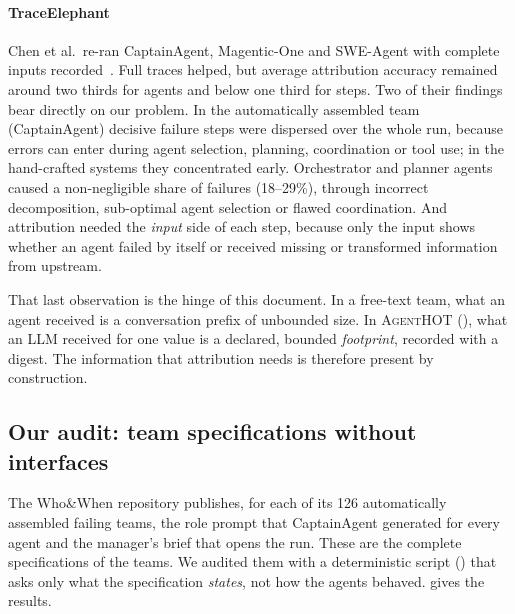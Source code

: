 \documentclass[10pt,a4paper]{article}
\newcommand{\tool}{\textsc{AgentHOT}}
\begin{document}
\paragraph{TraceElephant} Chen et al.\ re-ran CaptainAgent, Magentic-One and
SWE-Agent with complete inputs recorded~\cite{chen2026traceelephant}.
Full traces helped, but average attribution accuracy remained around
two thirds for agents and below one third for steps. Two of their findings
bear directly on our problem. In the automatically assembled team
(CaptainAgent) decisive failure steps were dispersed over the whole run,
because errors can enter during agent selection, planning, coordination or
tool use; in the hand-crafted systems they concentrated early.
Orchestrator and planner agents caused a non-negligible share of failures
(18--29\%), through incorrect decomposition, sub-optimal agent selection
or flawed coordination. And attribution needed the \emph{input} side of
each step, because only the input shows whether an agent failed by itself
or received missing or transformed information from upstream.

That last observation is the hinge of this document. In a free-text team,
what an agent received is a conversation prefix of unbounded size. In
\tool{} (), what an LLM received for one value is a
declared, bounded \emph{footprint}, recorded with a digest. The information
that attribution needs is therefore present by construction.

\subsection{Our audit: team specifications without interfaces}\label{sec:audit}

The Who\&When repository publishes, for each of its 126 automatically
assembled failing teams, the role prompt that CaptainAgent generated for
every agent and the manager's brief that opens the run. These are the
complete specifications of the teams. We audited them with a deterministic
script () that asks only what the specification
\emph{states}, not how the agents behaved.  gives the
results.
\end{document}

